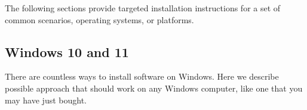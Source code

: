\sphinxAtStartPar
The following sections provide targeted installation instructions for a set of
common scenarios, operating systems, or platforms.


\ignorespaces 

\subsection{Windows 10 and 11}
\label{\detokenize{intro/installation:windows-10-and-11}}\label{\detokenize{intro/installation:index-2}}
\sphinxAtStartPar
There are countless ways to install software on Windows. Here we describe 
possible approach that should work on any Windows computer, like one that you
may have just bought.
